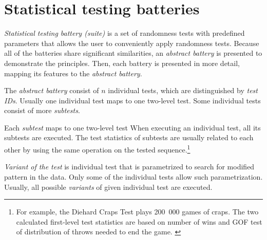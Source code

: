 \documentclass[
  digital,     %
  oneside,     %
  nosansbold,  %
  nocolorbold, %
  nolof,         %
  nolot,         %
]{fithesis4}
\begin{document}
\section{Statistical testing batteries} \label{chap:sols-batteries}



\emph{Statistical testing battery (suite)} is a set of randomness tests with predefined parameters that allows the user to conveniently apply randomness tests. \cite[p. 5]{tu01_guide} Because all of the batteries share significant similarities, an \emph{abstract battery} is presented to demonstrate the principles. Then, each battery is presented in more detail, mapping its features to the \emph{abstract battery}.

The \emph{abstract battery} consist of $n$ individual tests, which are distinguished by \emph{test IDs}. Usually one individual test maps to one two-level test. Some individual tests consist of more \emph{subtests}. 

Each \emph{subtest} maps to one two-level test When executing an individual test, all its subtests are executed. The test statistics of subtests are usually related to each other by using the same operation on the tested sequence.\footnote{For example, the Diehard Craps Test plays 200~000 games of craps. The two calculated first-level test statistics are based on number of wins and GOF test of distribution of throws needed to end the game. \cite{dieharder_orig}}

\emph{Variant of the test} is individual test that is parametrized to search for modified pattern in the data. Only some of the individual tests allow such parametrization. Usually, all possible \emph{variants} of given individual test are executed.  \cite[p. 2]{vavercak}
\end{document}
